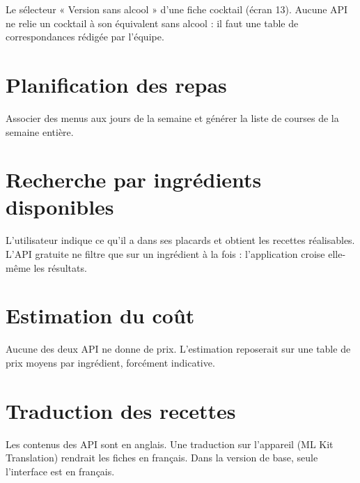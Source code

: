 Le sélecteur « Version sans alcool » d'une fiche cocktail (écran 13). Aucune
API ne relie un cocktail à son équivalent sans alcool : il faut une table de
correspondances rédigée par l'équipe.

\section{Planification des repas}

Associer des menus aux jours de la semaine et générer la liste de courses de
la semaine entière.

\section{Recherche par ingrédients disponibles}

L'utilisateur indique ce qu'il a dans ses placards et obtient les recettes
réalisables. L'API gratuite ne filtre que sur un ingrédient à la fois :
l'application croise elle-même les résultats.

\section{Estimation du coût}

Aucune des deux API ne donne de prix. L'estimation reposerait sur une table
de prix moyens par ingrédient, forcément indicative.

\section{Traduction des recettes}

Les contenus des API sont en anglais. Une traduction sur l'appareil (ML Kit
Translation) rendrait les fiches en français. Dans la version de base, seule
l'interface est en français.
